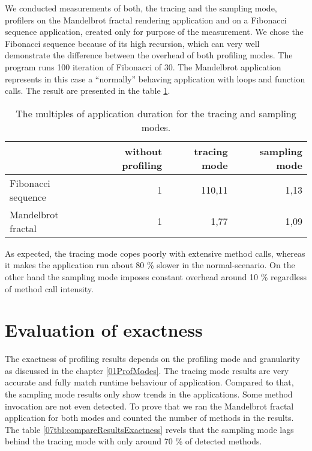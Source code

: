 We conducted measurements of both, the tracing and the sampling mode, profilers on the Mandelbrot fractal rendering application and on a Fibonacci sequence application, created only for purpose of the measurement. We chose the Fibonacci sequence because of its high recursion, which can very well demonstrate the difference between the overhead of both profiling modes. The program runs 100 iteration of Fibonacci of 30. The Mandelbrot application represents in this case a ``normally'' behaving application with loops and function calls. The result are presented in the table \ref{07tbl:compareResults}. 

\begin{table}
\centering
    \begin{tabular}{|l|r|r|r|}
        \hline
        ~                  & without profiling & tracing mode & sampling mode \\ \hline
        Fibonacci sequence & 1                 & 110,11       & 1,13          \\ 
        Mandelbrot fractal & 1                 & 1,77         & 1,09          \\
        \hline
    \end{tabular}
    \caption{The multiples of application duration for the tracing and sampling modes. }
    \label{07tbl:compareResults}
\end{table}
 
As expected, the tracing mode copes poorly with extensive method calls, whereas it makes the application run about 80 \% slower in the normal-scenario. On the other hand the sampling mode imposes constant overhead around 10 \% regardless of method call intensity.

\section{Evaluation of exactness}
The exactness of profiling results depends on the profiling mode and granularity as discussed in the chapter \ref{01ProfModes}. The tracing mode results are very accurate and fully match runtime behaviour of application. Compared to that, the sampling mode results only show trends in the applications. Some method invocation are not even detected. To prove that we ran the Mandelbrot fractal application for both modes and counted the number of methods in the results. The table \ref{07tbl:compareResultsExactness} revels that the sampling mode lags behind the tracing mode with only around 70 \% of detected methods.

